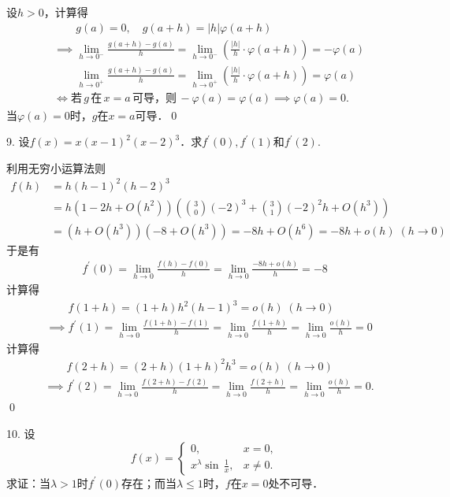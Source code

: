 设$h>0$，计算得
\begin{align}
    &\mathrel{\phantom{\implies}} g(a) = 0, \quad g(a+h) = \lvert h \rvert \varphi (a+h) \\
    &\implies \lim_{h \to 0^-} \frac{g(a+h)-g(a)}{h} = \lim_{h \to 0^-} \left( \frac{\lvert h \rvert}{h} \cdot \varphi (a+h) \right) = -\varphi (a) \\
    &\mathrel{\phantom{\implies}} \lim_{h \to 0^+} \frac{g(a+h)-g(a)}{h} = \lim_{h \to 0^+} \left(\frac{\lvert h \rvert}{h} \cdot \varphi (a+h)\right) = \varphi (a) \\
    &\iff \text{若} \, g  \, \text{在} \, x=a \, \text{可导，则} \, - \varphi (a) = \varphi (a) \implies \varphi (a) = 0.
\end{align}
当$ \varphi (a)=0$时，$g$在$x=a$可导．\qed\bigskip

9. 设$f(x) = x(x-1)^2(x-2)^3$．求$f^{\prime}(0), f^{\prime}(1)$和$f^{\prime}(2)$.

\solve 利用无穷小运算法则
\begin{align}
    f(h) &= h(h-1)^2(h-2)^3 \\
    &= h (1 - 2h + O(h^2))(\binom{3}{0}(-2)^3 + \binom{3}{1} (-2)^2 h + O(h^3)) \\
    &= (h + O(h^3))(-8 + O(h^3)) = -8h + O(h^6) = -8h + o(h) \; (h \to 0)
\end{align}
于是有
\begin{align}
    f^{\prime}(0) = \lim_{h \to 0} \frac{f(h)-f(0)}{h} = \lim_{h \to 0} \frac{-8h + o(h)}{h} = -8
\end{align}
计算得
\begin{align}
    &\mathrel{\phantom{\implies}} f(1+h) = (1+h)h^2 (h-1)^3 = o(h) \; (h \to 0) \\
    &\implies f^{\prime}(1) = \lim_{h \to 0} \frac{f(1+h)-f(1)}{h} = \lim_{h \to 0} \frac{f(1+h)}{h} = \lim_{h \to 0} \frac{o(h)}{h} = 0
\end{align}
计算得
\begin{align}
    &\mathrel{\phantom{\implies}} f(2+h) = (2+h)(1+h)^2 h^3 = o(h) \; (h \to 0) \\
    &\implies f^{\prime}(2) = \lim_{h \to 0} \frac{f(2+h)-f(2)}{h} = \lim_{h \to 0} \frac{f(2+h)}{h} = \lim_{h \to 0} \frac{o(h)}{h} = 0.
\end{align}
\qed\bigskip

10. 设
\begin{equation*}
    f(x) = \begin{cases}
        0, & x = 0, \\
        x^\lambda \sin \, \displaystyle\frac{1}{x}, & x \neq 0.
    \end{cases}
\end{equation*}
求证：当$\lambda > 1$时$f^{\prime}(0)$存在；而当$\lambda \leq 1$时，$f$在$x=0$处不可导．

